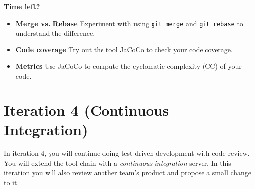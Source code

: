 \documentclass[swedish,english]{article}
\begin{document}
\textbf{Time left?}

\begin{itemize}
\item \textbf{Merge vs. Rebase} Experiment with using \verb'git merge' and \verb'git rebase' to understand the difference.
\item \textbf{Code coverage} Try out the tool JaCoCo to check your code coverage. 
\item \textbf{Metrics} Use JaCoCo to compute the cyclomatic complexity (CC) of your code.
\end{itemize}

\newpage

\section*{Iteration 4 (Continuous Integration)}
In iteration 4, you will continue doing test-driven development with code review. You will extend the tool chain with a \emph{continuous integration} server. In this iteration you will also review another team's product and propose a small change to it.
\end{document}
